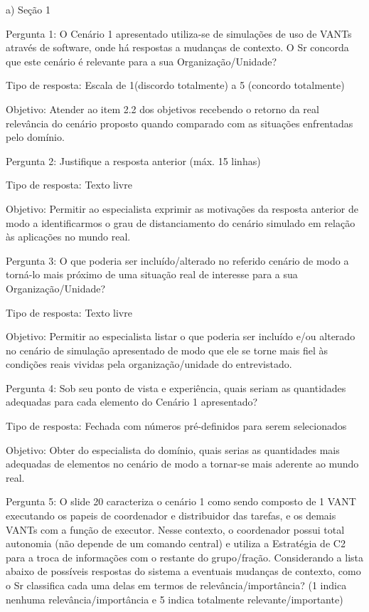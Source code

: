 a) Seção 1

Pergunta 1: O Cenário 1 apresentado utiliza-se de simulações de uso de VANTs através de software, onde há respostas a mudanças de contexto. O Sr concorda que este cenário é relevante  para a sua Organização/Unidade?  

Tipo de resposta: Escala de 1(discordo totalmente) a 5 (concordo totalmente)

Objetivo: Atender ao item 2.2 dos objetivos recebendo o retorno da real relevância do cenário proposto quando comparado com as situações enfrentadas pelo domínio.



Pergunta 2: Justifique a resposta anterior (máx. 15 linhas)

Tipo de resposta: Texto livre

Objetivo: Permitir ao especialista exprimir as motivações da resposta anterior de modo a identificarmos o grau de distanciamento do cenário simulado em relação às aplicações no mundo real.


Pergunta 3: O que poderia ser incluído/alterado no referido cenário de modo a torná-lo mais próximo de uma situação real de interesse para a sua Organização/Unidade?

Tipo de resposta: Texto livre

Objetivo: Permitir ao especialista listar o que poderia ser incluído e/ou alterado no cenário de simulação apresentado de modo que ele se torne mais fiel às condições reais vividas pela organização/unidade do entrevistado.


Pergunta 4: Sob seu ponto de vista e experiência, quais seriam as quantidades adequadas para cada elemento do Cenário 1 apresentado?

Tipo de resposta: Fechada com números pré-definidos para serem selecionados

Objetivo: Obter do especialista do domínio, quais serias as quantidades mais adequadas de elementos no cenário de modo a tornar-se mais aderente ao mundo real.


Pergunta 5: O slide 20 caracteriza o cenário 1 como sendo composto de 1 VANT executando os papeis de coordenador e distribuidor das tarefas, e os demais VANTs com a função de executor. Nesse contexto, o coordenador possui total autonomia (não depende de um comando central) e utiliza a Estratégia de C2 para a troca de informações com o restante do grupo/fração. Considerando a lista abaixo de possíveis respostas do sistema a eventuais mudanças de contexto, como o Sr classifica cada uma delas em termos de relevância/importância? (1 indica nenhuma relevância/importância e 5 indica totalmente relevante/importante)

